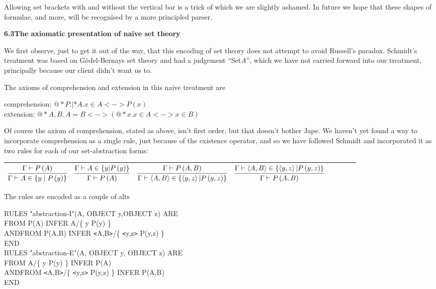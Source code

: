 Allowing set brackets with and without the vertical bar is a trick of which we are slightly ashamed. In future we hope that these shapes of formulae, and more, will be recognised by a more principled parser.


\textbf{6.3\tab The axiomatic presentation of naive set theory}


We first observe, just to get it out of the way, that this encoding of set theory does not attempt to avoid Russell's paradox. Schmidt's treatment was based on G\"{o}del-Bernays set theory and had a judgement ``Set{\nobreakspace}\textit{A}'', which we have not carried forward into our treatment, principally because our client didn't want us to.


The axioms of comprehension and extension in this naive treatment are


comprehension: $@*P.|*A.x\in A<->P(x)$ \\
extension: $@*A,B.\,A=B<->(@*x.x\in A<->x\in B)$



Of course the axiom of comprehension, stated as above, isn't first order, but that doesn't bother Jape. We haven't yet found a way to incorporate comprehension as a single rule, just because of the existence operator, and so we have followed Schmidt and incorporated it as two rules for each of our set-abstraction forms:\\


\begin{tabular}{|p{0.886in}|p{0.912in}|p{1.249in}|p{1.276in}|p{0.044in}|p{0.044in}|p{0.044in}|p{0.044in}|} \hline
{\raggedright $\infer
       {\Gamma  |- A\in \left\{ y \mid P\left( y\right) \right\} }
       {\Gamma  |- P\left( A\right) }$ } & 
{\raggedright $\infer
       {\Gamma |- P\left( A\right) }
       {\Gamma  |- A\in \left\{ y|P\left( y\right) \right\} } $ } & 
{\raggedright $\infer
       {\Gamma  |- \left\langle A,B\right\rangle \in \left\{ \left\langle y,z\right\rangle |P\left( y,z\right) \right\} }
       {\Gamma  |- P\left( A,B\right) }$ } & 
{\raggedright $\infer
       {\Gamma  |- P\left( A,B\right) }
       {\Gamma  |- \left\langle A,B\right\rangle \in \left\{ \left\langle y,z\right\rangle |P\left( y,z\right) \right\} }$ }\\
\hline \end{tabular}


The rules are encoded as a couple of alts

RULES "abstraction-I"(A, OBJECT y,OBJECT z) ARE \\
\tab FROM P(A) INFER A/\{ y {\textbar} P(y) \}\\
AND\tab FROM P(A,B) INFER \texttt{<}A,B\texttt{>}/\{ \texttt{<}y,z\texttt{>} {\textbar} P(y,z) \}\\
END\\
RULES "abstraction-E"(A, OBJECT y, OBJECT z) ARE\\
\tab FROM A/\{ y {\textbar} P(y) \} INFER P(A) \\
AND\tab FROM \texttt{<}A,B\texttt{>}/\{ \texttt{<}y,z\texttt{>} {\textbar} P(y,z) \} INFER P(A,B)\\
END


